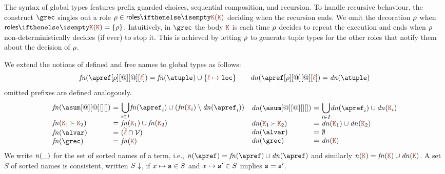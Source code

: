 The syntax of global types features prefix guarded choices, sequential
composition, and recursion.
%
To handle recursive behaviour, 
the construct $\grec$ singles out a role $\arole \in \roles \aK$
%
deciding when the recursion ends.
%
We omit the decoration $\rho$ when $\roles \aK = \{\arole\}$.
%
Intuitively, in $\grec$ the body $\aK$ is each time $\rho$ decides
to repeat the execution and ends when $\rho$ non-deterministically
decides (if ever) to stop it.
%
This is achieved by letting $\rho$ to generate tuple types for the
other roles that notify them about the decision of $\rho$.

We extend the notions of defined and free names to global types as
follows:
\[
 \fn{\apref[\arole][@][@][\alocvar]}
 = \fn \atuple \cup \{\alocvar \mapsto \asort[loc]\} 
\qquad
 \dn{\apref[\arole][@][@][\alocvar]} 
 = \dn \atuple 
\]
omitted prefixes are defined analogously.
\[
  \begin{array}{ll}
    \begin{array}{l@{\ =\ } ll}
      \fn{\asum[@][@][][]} & \displaystyle{\bigcup_{i\in I}} \fn{\apref_i} \cup (\fn{\aK_i}\setminus\dn{\apref_i})
      \\
      \fn{\aK_1 \seqop \aK_2} 
                &
                  \fn{\aK_1}\cup\fn{\aK_2}
      \\
      \fn \alvar & (\seq \alocvar \cap \varset)
      \\
      \fn \grec & \fn {\aK}
    \end{array}
    \begin{array}{l@{\ =\ } ll}
      \dn{\asum[@][@][][]} & \displaystyle{\bigcup_{i\in I}} \dn{\apref_i} \cup \dn{\aK_i}
      \\
      \dn{\aK_1 \seqop \aK_2} 
                           &
                             \dn{\aK_1}\cup\dn{\aK_2}
      \\
      \dn \alvar & \emptyset
      \\
      \dn \grec & \dn {\aK}
    \end{array}
  \end{array}
\]
%
We write ${\it n}(\_)$ for the set of sorted names of a term, i.e.,
$\names \apref = \fn\apref \cup \dn\apref$ and similarly
$\names \aK = \fn\aK \cup \dn\aK$. A set $S$ of sorted names is
consistent, written $S\downarrow$, if $x\mapsto \mathtt{s} \in S$ and
$x\mapsto \mathtt{s}' \in S$ implies $\mathtt{s} = \mathtt{s}'$.
 
